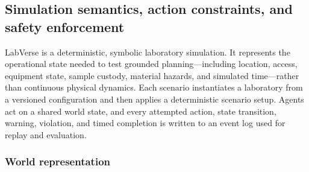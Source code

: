 
\subsection{Simulation semantics, action constraints, and safety enforcement}
\label{sec:simulation_constraints}

LabVerse is a deterministic, symbolic laboratory simulation. It represents
the operational state needed to test grounded planning---including location,
access, equipment state, sample custody, material hazards, and simulated
time---rather than continuous physical dynamics. Each scenario instantiates a
laboratory from a versioned configuration and then applies a deterministic
scenario setup. Agents act on a shared world state, and every attempted action,
state transition, warning, violation, and timed completion is written to an
event log used for replay and evaluation.

\subsubsection{World representation}


